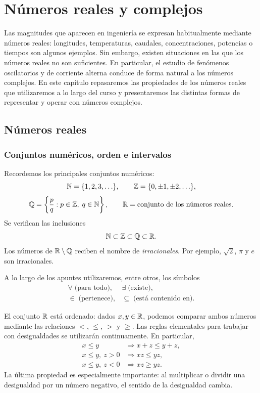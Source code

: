 \chapter{Números reales y complejos}
\label{ch:numeros}

Las magnitudes que aparecen en ingeniería se expresan habitualmente mediante números reales: longitudes, temperaturas, caudales, concentraciones, potencias o tiempos son algunos ejemplos. Sin embargo, existen situaciones en las que los números reales no son suficientes. En particular, el estudio de fenómenos oscilatorios y de corriente alterna conduce de forma natural a los números complejos. En este capítulo repasaremos las propiedades de los números reales que utilizaremos a lo largo del curso y presentaremos las distintas formas de representar y operar con números complejos.

\section{Números reales}
\label{sec:reales}

\subsection{Conjuntos numéricos, orden e intervalos}

Recordemos los principales conjuntos numéricos:
\[
\mathbb{N}=\{1,2,3,\ldots\},\qquad
\mathbb{Z}=\{0,\pm1,\pm2,\ldots\},
\]
\[
\mathbb{Q}=\left\{\frac{p}{q}:p\in\mathbb{Z},\;q\in\mathbb{N}\right\},
\qquad
\mathbb{R}=\text{conjunto de los números reales}.
\]
Se verifican las inclusiones
\[
\mathbb{N}\subset\mathbb{Z}\subset\mathbb{Q}\subset\mathbb{R}.
\]
Los números de \(\mathbb{R}\setminus\mathbb{Q}\) reciben el nombre de \emph{irracionales}. Por ejemplo,
\(\sqrt{2}\), \(\pi\) y \(e\) son irracionales.

A lo largo de los apuntes utilizaremos, entre otros, los símbolos
\[
\begin{array}{ll}
\forall\;	\text{(para todo)}, & \exists\;	\text{(existe)},\\[2mm]
\in\;	\text{(pertenece)}, & \subseteq\;	\text{(está contenido en)}.
\end{array}
\]

El conjunto \(\mathbb{R}\) está ordenado: dados \(x,y\in\mathbb{R}\), podemos comparar ambos números mediante las relaciones \(<\), \(\leq\), \(>\) y \(\geq\). Las reglas elementales para trabajar con desigualdades se utilizarán continuamente. En particular,
\begin{align*}
 x\leq y &\Longrightarrow x+z\leq y+z,\\
 x\leq y,\ z>0 &\Longrightarrow xz\leq yz,\\
 x\leq y,\ z<0 &\Longrightarrow xz\geq yz.
\end{align*}
La última propiedad es especialmente importante: al multiplicar o dividir una desigualdad por un número negativo, el sentido de la desigualdad cambia.


